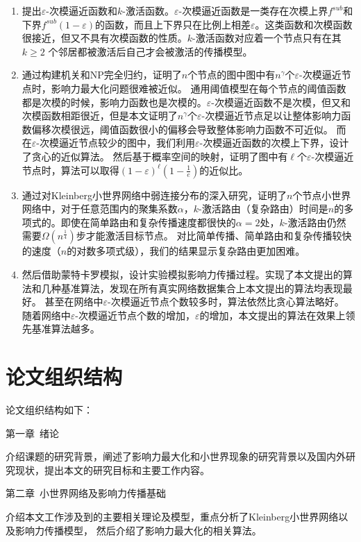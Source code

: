 \begin{enumerate}
\item  提出$\varepsilon$-次模逼近函数和$k$-激活函数。$\varepsilon$-次模逼近函数是一类存在次模上界$f^{sub}$和下界$f^{sub}(1-\varepsilon)$的函数，而且上下界只在比例上相差$\varepsilon$。这类函数和次模函数很接近，但又不具有次模函数的性质。$k$-激活函数对应着一个节点只有在其$k \geq 2$ 个邻居都被激活后自己才会被激活的传播模型。
\item  通过构建机关和NP完全归约，证明了$n$个节点的图中图中有$n^{\gamma}$个$\varepsilon$-次模逼近节点时，影响力最大化问题很难被近似。
通用阈值模型在每个节点的阈值函数都是次模的时候，影响力函数也是次模的\cite{Mossel2007sub}。$\varepsilon$-次模逼近函数不是次模，但又和次模函数相距很近，但是本文证明了$n^{\gamma}$个$\varepsilon$-次模逼近节点足以让整体影响力函数偏移次模很远，阈值函数很小的偏移会导致整体影响力函数不可近似。
而在$\varepsilon$-次模逼近节点较少的图中，我们利用$\varepsilon$-次模逼近函数的次模上下界，设计了贪心的近似算法。
然后基于概率空间的映射，证明了图中有$\ell$个$\varepsilon$-次模逼近节点时，算法可以取得$(1-\varepsilon)^{\ell}(1-\frac{1}{e})$的近似比。
\item  通过对Kleinberg小世界网络中弱连接分布的深入研究，证明了$n$个节点小世界网络中，对于任意范围内的聚集系数$\alpha$，$k$-激活路由（复杂路由）时间是$n$的多项式的。即使在简单路由和复杂传播速度都很快的$\alpha=2$处，$k$-激活路由仍然需要$\Omega(n^{\frac{1}{4}})$步才能激活目标节点。
对比简单传播、简单路由和复杂传播较快的速度（$n$的对数多项式级），我们的结果显示复杂路由更加困难。
\item  然后借助蒙特卡罗模拟，设计实验模拟影响力传播过程。实现了本文提出的算法和几种基准算法，发现在所有真实网络数据集合上本文提出的算法均表现最好。
甚至在网络中$\varepsilon$-次模逼近节点个数较多时，算法依然比贪心算法略好。
随着网络中$\varepsilon$-次模逼近节点个数的增加，$\varepsilon$的增加，本文提出的算法在效果上领先基准算法越多。
\end{enumerate}

\section{论文组织结构}
论文组织结构如下：

第一章~绪论

介绍课题的研究背景，阐述了影响力最大化和小世界现象的研究背景以及国内外研究现状，提出本文的研究目标和主要工作内容。

第二章~小世界网络及影响力传播基础

介绍本文工作涉及到的主要相关理论及模型，重点分析了Kleinberg小世界网络以及影响力传播模型，
然后介绍了影响力最大化的相关算法。

